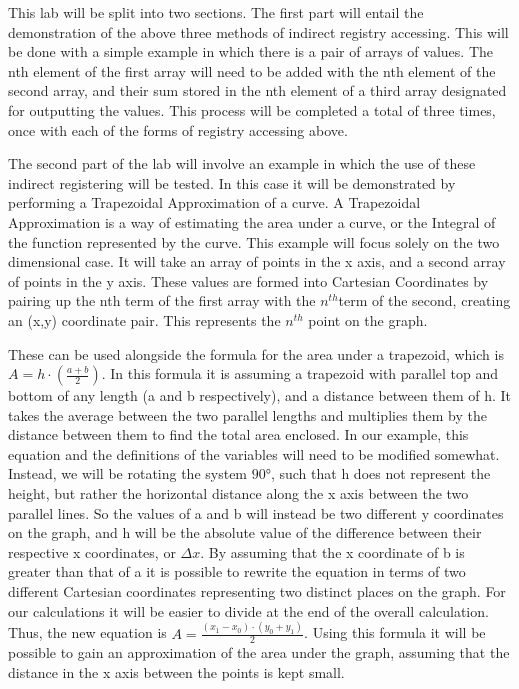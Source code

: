 \documentclass[letterpaper]{article}
\begin{document}
  This lab will be split into two sections. The first part will entail the
  demonstration of the above three methods of indirect registry accessing.  This
  will be done with a simple example in which there is a pair of arrays of
  values. The nth element of the first array will need to be added with the nth
  element of the second array, and their sum stored in the nth element of a third
  array designated for outputting the values.  This process will be completed a
  total of three times, once with each of the forms of registry accessing above.

  The second part of the lab will involve an example in which the use of these
  indirect registering will be tested. In this case it will be demonstrated by
  performing a Trapezoidal Approximation of a curve. A Trapezoidal Approximation
  is a way of estimating the area under a curve, or the Integral of the function
  represented by the curve. This example will focus solely on the two dimensional
  case. It will take an array of points in the x axis, and a second array of
  points in the y axis. These values are formed into Cartesian Coordinates by
  pairing up the nth term of the first array with the $n^{th}$term of the second,
  creating an (x,y) coordinate pair. This represents the $n^{th}$ point on the graph.

  These can be used alongside the formula for the area under a trapezoid, which is
  $A= h\cdot(\frac{a+b}{2})$. In this formula it is assuming a trapezoid with parallel
  top and bottom of any length (a and b respectively), and a distance between them of
  h.  It takes the average between the two parallel lengths and multiplies them by the
  distance between them to find the total area enclosed.  In our example, this equation
  and the definitions of the variables will need to be modified somewhat. Instead, we
  will be rotating the system $\ang{90}$, such that h does not represent the height, but
  rather the horizontal distance along the x axis between the two parallel lines.
  So the values of a and b will instead be
  two different y coordinates on the graph, and h will be the absolute value of the
  difference between their respective x coordinates, or
  $\Delta x$. By assuming that the x coordinate
  of b is greater than that of a it is possible to rewrite the equation in terms of two
  different Cartesian coordinates representing two distinct places on the graph. For our
  calculations it will be easier to divide at the end of the overall calculation. Thus,
  the new equation is $A=\frac{(x_1-x_0)\cdot(y_0+y_1)}{2}$. Using this formula it will be
  possible to gain an approximation of the area under the graph, assuming that the
  distance in the x axis between the points is kept small.
\end{document}
